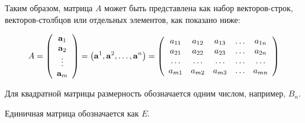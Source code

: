 Таким образом, матрица $A$ может быть представлена как набор
векторов-строк, векторов-столбцов или отдельных элементов, как
показано ниже:

\[
A = \left( {\begin{array}{*{20}c}
   {\vc{a}_1 }  \\
   {\vc{a}_2 }  \\
    \vdots   \\
   {\vc{a}_m }  \\
\end{array}} \right) = \left( {\vc{a}^1 ,\vc{a}^2 , \ldots ,\vc{a}^n } \right) = \left( {\begin{array}{*{20}c}
   {a_{11} } & {a_{12} } & {a_{13} } &  \ldots  & {a_{1n} }  \\
   {a_{21} } & {a_{22} } & {a_{23} } &  \ldots  & {a_{2n} }  \\
    \ldots  &  \ldots  &  \ldots  &  \ldots  &  \ldots   \\
   {a_{m1} } & {a_{m2} } & {a_{m3} } &  \ldots  & {a_{mn} }  \\
\end{array}} \right)
\]


Для квадратной матрицы размерность обозначается одним числом,
например, $B_{n}$.

Единичная матрица обозначается как $E$.
